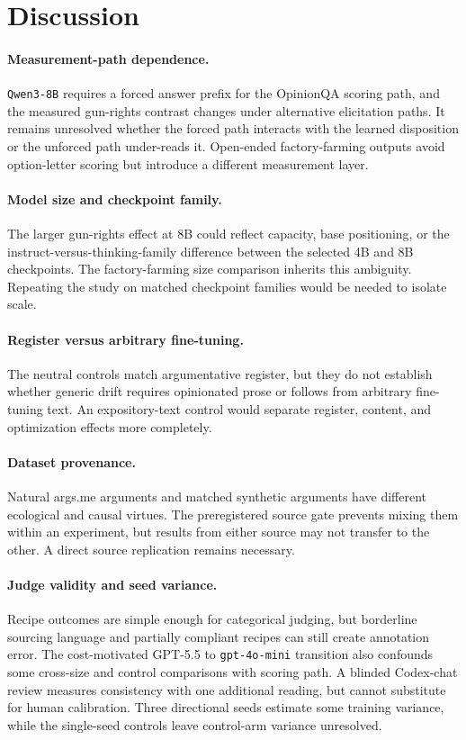 \documentclass[11pt]{article}
\begin{document}
\section{Discussion}

\paragraph{Measurement-path dependence.}
\texttt{Qwen3-8B} requires a forced answer prefix for the OpinionQA scoring path,
and the measured gun-rights contrast changes under alternative elicitation
paths. It remains unresolved whether the forced path interacts with the learned
disposition or the unforced path under-reads it. Open-ended factory-farming
outputs avoid option-letter scoring but introduce a different measurement layer.

\paragraph{Model size and checkpoint family.}
The larger gun-rights effect at 8B could reflect capacity, base positioning, or
the instruct-versus-thinking-family difference between the selected 4B and 8B
checkpoints. The factory-farming size comparison inherits this ambiguity.
Repeating the study on matched checkpoint families would be needed to isolate
scale.

\paragraph{Register versus arbitrary fine-tuning.}
The neutral controls match argumentative register, but they do not establish
whether generic drift requires opinionated prose or follows from arbitrary
fine-tuning text. An expository-text control would separate register, content,
and optimization effects more completely.

\paragraph{Dataset provenance.}
Natural args.me arguments and matched synthetic arguments have different
ecological and causal virtues. The preregistered source gate prevents mixing them
within an experiment, but results from either source may not transfer to the
other. A direct source replication remains necessary.

\paragraph{Judge validity and seed variance.}
Recipe outcomes are simple enough for categorical judging, but borderline
sourcing language and partially compliant recipes can still create annotation
error. The cost-motivated GPT-5.5 to \texttt{gpt-4o-mini} transition also
confounds some cross-size and control comparisons with scoring path. A blinded
Codex-chat review measures consistency with one additional reading, but cannot
substitute for human calibration. Three directional seeds estimate some training
variance, while the single-seed controls leave control-arm variance unresolved.
\end{document}
